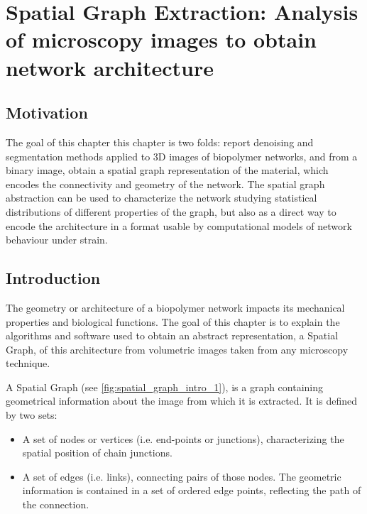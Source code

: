 
\chapter{Spatial Graph Extraction: Analysis of microscopy images to obtain network architecture} %

\label{Chapter-Image} %


\section{Motivation}%
\label{sec:motivation-image}

The goal of this chapter this chapter is two folds: report denoising and segmentation methods applied to 3D images of biopolymer networks, and from a binary image, obtain a spatial graph representation of the material, which encodes the connectivity and geometry of the network.
The spatial graph abstraction can be used to characterize the network studying statistical distributions of different properties of the graph, but also as a direct way to encode the architecture in a format usable by computational models of network behaviour under strain.

\section{Introduction}%
\label{sec:introduction}

The geometry or architecture of a biopolymer network impacts its mechanical
properties and biological functions.
The goal of this chapter is to explain the algorithms and software used to
obtain an abstract representation, a \gls{Spatial Graph}, of this architecture from volumetric images taken from any microscopy technique.

A \gls{Spatial Graph} (see \autoref{fig:spatial_graph_intro_1}), is a graph containing geometrical information about the image from which it is extracted. It is defined by two sets:
\begin{itemize}[topsep=0pt]
  \item A set of nodes or vertices (i.e. end-points or junctions), characterizing the spatial position of chain junctions.
  \item A set of edges (i.e. links), connecting pairs of those nodes. The geometric information is contained in a set of ordered edge points, reflecting the path of the connection.
\end{itemize}


